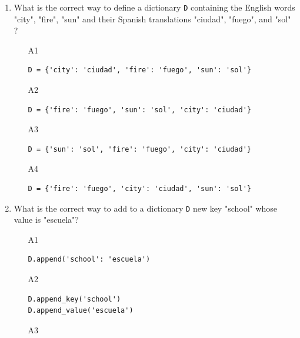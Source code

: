 \begin{enumerate}
\begin{enumerate}
\begin{verbatim}
['John', 'Jerry', 'Jed', '1', '2', '3']
\end{verbatim}
\item[A2] 
\begin{verbatim}
[('John', 'Jerry', 'Jed'), ('1', '2', '3')]
\end{verbatim}
\item[A3] 
\begin{verbatim}
[('1', 'John'), ('2', 'Jerry'), ('3', 'Jed')]
\end{verbatim}
\item[A4] 
\begin{verbatim}
[('John', '1'), ('Jerry', '2'), ('Jed', '3')]
\end{verbatim}
\end{enumerate}
\item What is the correct way to define a dictionary {\tt D} containing the 
      English words "city", "fire", "sun" and their Spanish translations "ciudad",
      "fuego", and "sol" ?
\begin{enumerate}
\item[A1] 
\begin{verbatim}
D = {'city': 'ciudad', 'fire': 'fuego', 'sun': 'sol'}
\end{verbatim}
\item[A2] 
\begin{verbatim}
D = {'fire': 'fuego', 'sun': 'sol', 'city': 'ciudad'}
\end{verbatim}
\item[A3] 
\begin{verbatim}
D = {'sun': 'sol', 'fire': 'fuego', 'city': 'ciudad'}
\end{verbatim}
\item[A4] 
\begin{verbatim}
D = {'fire': 'fuego', 'city': 'ciudad', 'sun': 'sol'}
\end{verbatim}
\end{enumerate}
\item What is the correct way to add to a dictionary {\tt D} new key 
"school" whose value is "escuela"? 
\begin{enumerate}
\item[A1] 
\begin{verbatim}
D.append('school': 'escuela')
\end{verbatim}
\item[A2] 
\begin{verbatim}
D.append_key('school')
D.append_value('escuela')
\end{verbatim}
\item[A3] 

\end{enumerate}
\end{enumerate}
